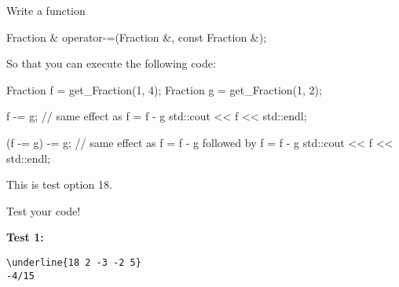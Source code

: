 Write a function
\begin{console}[commandchars=\\\{\}]
Fraction & operator-=(Fraction &, const Fraction &);
\end{console}

So that you can execute the following code:
\begin{console}
Fraction f = get_Fraction(1, 4);
Fraction g = get_Fraction(1, 2);

f -= g; // same effect as f = f - g
std::cout << f << std::endl;

(f -= g) -= g; // same effect as f = f - g followed by f = f - g
std::cout << f << std::endl;
\end{console}
This is test option 18.

Test your code!

\textbf{Test 1:}
\begin{Verbatim}[frame=single, commandchars=\\\{\}]
\underline{18 2 -3 -2 5}
-4/15
\end{Verbatim}
